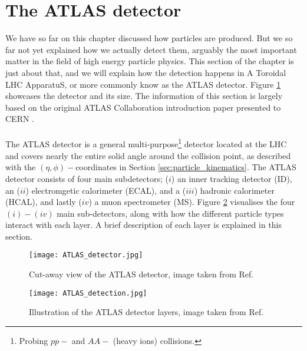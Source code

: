 \documentclass[12pt, a4paper]{book}
\begin{document}
\section{The ATLAS detector}\label{sec:ATLAS}
We have so far on this chapter discussed how particles are produced. But we so far not yet explained how we actually detect them, arguably the most important matter in the field of high energy particle physics.
This section of the chapter is just about that, and we will explain how the detection happens in A Toroidal LHC ApparatuS, or more commonly know as the ATLAS detector. Figure \ref{fig:ATLAS_detector} showcases 
the detector and its size. The information of this section is largely based on the original ATLAS Collaboration introduction paper presented to CERN 
\cite{Aad:1129811}.\\
\\The ATLAS detector is a general multi-purpose\footnote{Probing $pp-$ and $AA-$ (heavy ions) collisions.} detector located at the LHC and covers nearly the entire solid angle 
around the collision point, as described with the $(\eta,\phi)-$coordinates in Section \ref{sec:particle_kinematics}. The ATLAS detector consists of four main subdetectors; ($i$) an inner tracking detector (ID), 
an ($ii$) electromgetic calorimeter (ECAL), and a ($iii$) hadronic calorimeter (HCAL), and lastly ($iv$) a muon spectrometer (MS). Figure \ref{fig:ATLAS_layers} visualises the four $(i)-(iv)$ main sub-detectors, 
along with how the different particle types interact with each layer. A brief description of each layer is explained in this section.
\begin{figure}[!ht]
	\centering
    \texttt{[image: ATLAS\_detector.jpg]}
    \caption[The ATLAS detector]{Cut-away view of the ATLAS detector, image taken from Ref. \cite{Aad:1129811}}\label{fig:ATLAS_detector}
\end{figure}
\begin{figure}[!ht]
	\centering
    \texttt{[image: ATLAS\_detection.jpg]}
    \caption[Illustration of the ATLAS detector layers]{Illustration of the ATLAS detector layers, image taken from Ref. \cite{Pequenao:1505342}}\label{fig:ATLAS_layers}
\end{figure}
\end{document}
